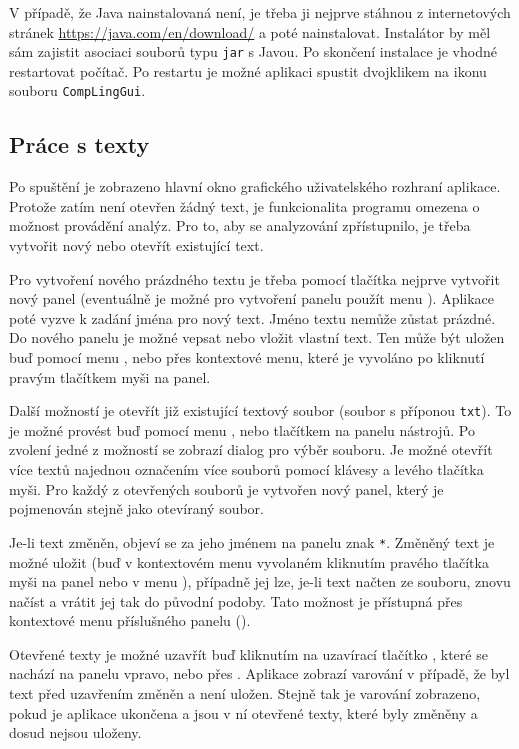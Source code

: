 \documentclass[dp.tex]{subfiles}
\begin{document}
V případě, že Java nainstalovaná není, je třeba ji nejprve stáhnou z internetových stránek \url{https://java.com/en/download/} a poté nainstalovat. Instalátor by měl sám zajistit asociaci souborů typu \texttt{jar} s Javou. Po skončení instalace je vhodné restartovat počítač. Po restartu je možné aplikaci spustit dvojklikem na ikonu souboru \texttt{CompLingGui}.

\subsection{Práce s texty}

Po spuštění je zobrazeno hlavní okno grafického uživatelského rozhraní aplikace. Protože zatím není otevřen žádný text, je funkcionalita programu omezena o možnost provádění analýz. Pro to, aby se analyzování zpřístupnilo, je třeba vytvořit nový nebo otevřít existující text.

Pro vytvoření nového prázdného textu je třeba pomocí tlačítka  nejprve vytvořit nový panel (eventuálně je možné pro vytvoření panelu použít menu ). Aplikace poté vyzve k zadání jména pro nový text. Jméno textu nemůže zůstat prázdné. Do nového panelu je možné vepsat nebo vložit vlastní text. Ten může být uložen buď pomocí menu , nebo přes kontextové menu, které je vyvoláno po kliknutí pravým tlačítkem myši na panel.

Další možností je otevřít již existující textový soubor (soubor s příponou \texttt{txt}). To je možné provést buď pomocí menu , nebo tlačítkem  na panelu nástrojů. Po zvolení jedné z možností se zobrazí dialog pro výběr souboru. Je možné otevřít více textů najednou označením více souborů pomocí klávesy \keys{\ctrl} a levého tlačítka myši. Pro každý z otevřených souborů je vytvořen nový panel, který je pojmenován stejně jako otevíraný soubor.

Je-li text změněn, objeví se za jeho jménem na panelu znak \texttt{*}. Změněný text je možné uložit (buď v kontextovém menu vyvolaném kliknutím pravého tlačítka myši na panel nebo v menu ), případně jej lze, je-li text načten ze souboru, znovu načíst a vrátit jej tak do původní podoby. Tato možnost je přístupná přes kontextové menu příslušného panelu ().

Otevřené texty je možné uzavřít buď kliknutím na uzavírací tlačítko , které se nachází na panelu vpravo, nebo přes . Aplikace zobrazí varování v případě, že byl text před uzavřením změněn a není uložen. Stejně tak je varování zobrazeno, pokud je aplikace ukončena a jsou v ní otevřené texty, které byly změněny a dosud nejsou uloženy.
\end{document}
